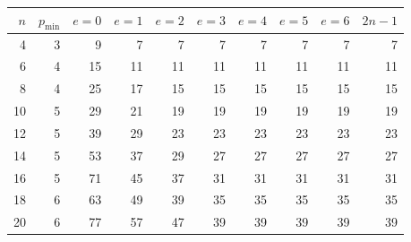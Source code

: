 
\begin{tabular}{r r r r r r r r r r}
\toprule
$n$ & $p_{\min}$ & $e{=}0$ & $e{=}1$ & $e{=}2$ & $e{=}3$ & $e{=}4$ & $e{=}5$ & $e{=}6$ & $2n-1$ \\
\midrule
4 & 3 & 9 & 7 & 7 & 7 & 7 & 7 & 7 & 7 \\
6 & 4 & 15 & 11 & 11 & 11 & 11 & 11 & 11 & 11 \\
8 & 4 & 25 & 17 & 15 & 15 & 15 & 15 & 15 & 15 \\
10 & 5 & 29 & 21 & 19 & 19 & 19 & 19 & 19 & 19 \\
12 & 5 & 39 & 29 & 23 & 23 & 23 & 23 & 23 & 23 \\
14 & 5 & 53 & 37 & 29 & 27 & 27 & 27 & 27 & 27 \\
16 & 5 & 71 & 45 & 37 & 31 & 31 & 31 & 31 & 31 \\
18 & 6 & 63 & 49 & 39 & 35 & 35 & 35 & 35 & 35 \\
20 & 6 & 77 & 57 & 47 & 39 & 39 & 39 & 39 & 39 \\
\bottomrule
\end{tabular}
